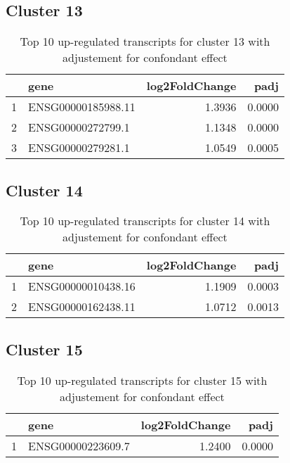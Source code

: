 \documentclass{article}
\begin{document}
\subsection{Cluster 13 }
\begin{table}[H]
\centering
\begin{tabular}{rlrr}
  \hline
 & gene & log2FoldChange & padj \\ 
  \hline
1 & ENSG00000185988.11 & 1.3936 & 0.0000 \\ 
  2 & ENSG00000272799.1 & 1.1348 & 0.0000 \\ 
  3 & ENSG00000279281.1 & 1.0549 & 0.0005 \\ 
   \hline
\end{tabular}
\caption{Top 10 up-regulated transcripts for cluster 13 with adjustement for confondant effect} 
\label{tab:q3_1_conf_13}
\end{table}
\subsection{Cluster 14 }
\begin{table}[H]
\centering
\begin{tabular}{rlrr}
  \hline
 & gene & log2FoldChange & padj \\ 
  \hline
1 & ENSG00000010438.16 & 1.1909 & 0.0003 \\ 
  2 & ENSG00000162438.11 & 1.0712 & 0.0013 \\ 
   \hline
\end{tabular}
\caption{Top 10 up-regulated transcripts for cluster 14 with adjustement for confondant effect} 
\label{tab:q3_1_conf_14}
\end{table}
\subsection{Cluster 15 }
\begin{table}[H]
\centering
\begin{tabular}{rlrr}
  \hline
 & gene & log2FoldChange & padj \\ 
  \hline
1 & ENSG00000223609.7 & 1.2400 & 0.0000 \\ 
   \hline
\end{tabular}
\caption{Top 10 up-regulated transcripts for cluster 15 with adjustement for confondant effect} 
\label{tab:q3_1_conf_15}
\end{table}
\end{document}
